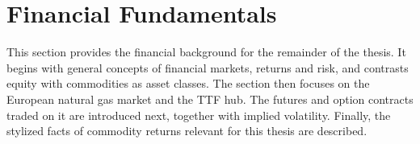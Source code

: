 \section{Financial Fundamentals}\label{sec:financial-fundamentals}
This section provides the financial background for the remainder of the thesis. It begins with general concepts of financial markets, returns and risk, and contrasts equity with commodities as asset classes. The section then focuses on the European natural gas market and the TTF hub. The futures and option contracts traded on it are introduced next, together with implied volatility. Finally, the stylized facts of commodity returns relevant for this thesis are described.





